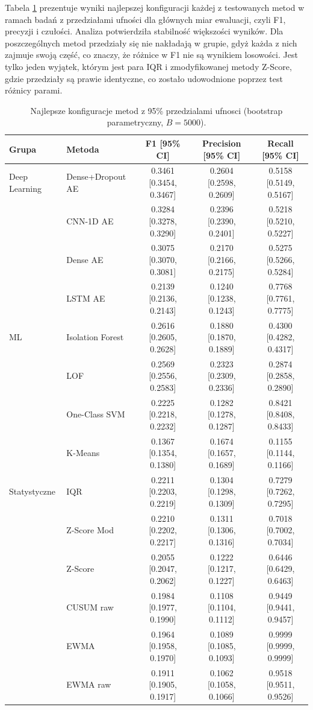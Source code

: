 \documentclass[a4paper,twoside,12pt]{book}
\begin{document}
	Tabela \ref{tab:bootstrap_ci} prezentuje wyniki najlepszej konfiguracji każdej z testowanych metod w ramach badań z przedziałami ufności dla głównych miar ewaluacji, czyli F1, precyzji i czułości. 
	Analiza potwierdziła stabilność większości wyników. Dla poszczególnych metod przedziały się nie nakładają w grupie, gdyż każda z nich zajmuje swoją część, co znaczy, że różnice w F1 nie są wynikiem losowości. Jest tylko jeden wyjątek, którym jest para IQR i zmodyfikowanej metody Z-Score, gdzie przedziały są prawie identyczne, co zostało udowodnione poprzez test różnicy parami.
	
	\begin{table}[ht]
		\centering
		\caption{Najlepsze konfiguracje metod z 95\% przedzialami ufnosci (bootstrap parametryczny, $B=5000$).}
		\label{tab:bootstrap_ci}
		\small
		\begin{tabular}{llccc}
			\toprule
			Grupa & Metoda & F1 [95\% CI] & Precision [95\% CI] & Recall [95\% CI] \\
			\midrule
			Deep Learning & Dense+Dropout AE & 0.3461 [0.3454, 0.3467] & 0.2604 [0.2598, 0.2609] & 0.5158 [0.5149, 0.5167] \\
			& CNN-1D AE & 0.3284 [0.3278, 0.3290] & 0.2396 [0.2390, 0.2401] & 0.5218 [0.5210, 0.5227] \\
			& Dense AE & 0.3075 [0.3070, 0.3081] & 0.2170 [0.2166, 0.2175] & 0.5275 [0.5266, 0.5284] \\
			& LSTM AE & 0.2139 [0.2136, 0.2143] & 0.1240 [0.1238, 0.1243] & 0.7768 [0.7761, 0.7775] \\
			\midrule
			ML & Isolation Forest & 0.2616 [0.2605, 0.2628] & 0.1880 [0.1870, 0.1889] & 0.4300 [0.4282, 0.4317] \\
			& LOF & 0.2569 [0.2556, 0.2583] & 0.2323 [0.2309, 0.2336] & 0.2874 [0.2858, 0.2890] \\
			& One-Class SVM & 0.2225 [0.2218, 0.2232] & 0.1282 [0.1278, 0.1287] & 0.8421 [0.8408, 0.8433] \\
			& K-Means & 0.1367 [0.1354, 0.1380] & 0.1674 [0.1657, 0.1689] & 0.1155 [0.1144, 0.1166] \\
			\midrule
			Statystyczne & IQR & 0.2211 [0.2203, 0.2219] & 0.1304 [0.1298, 0.1309] & 0.7279 [0.7262, 0.7295] \\
			& Z-Score Mod & 0.2210 [0.2202, 0.2217] & 0.1311 [0.1306, 0.1316] & 0.7018 [0.7002, 0.7034] \\
			& Z-Score & 0.2055 [0.2047, 0.2062] & 0.1222 [0.1217, 0.1227] & 0.6446 [0.6429, 0.6463] \\
			& CUSUM raw & 0.1984 [0.1977, 0.1990] & 0.1108 [0.1104, 0.1112] & 0.9449 [0.9441, 0.9457] \\
			& EWMA & 0.1964 [0.1958, 0.1970] & 0.1089 [0.1085, 0.1093] & 0.9999 [0.9999, 0.9999] \\
			& EWMA raw & 0.1911 [0.1905, 0.1917] & 0.1062 [0.1058, 0.1066] & 0.9518 [0.9511, 0.9526] \\
			\bottomrule
		\end{tabular}
	\end{table}
	
\end{document}
